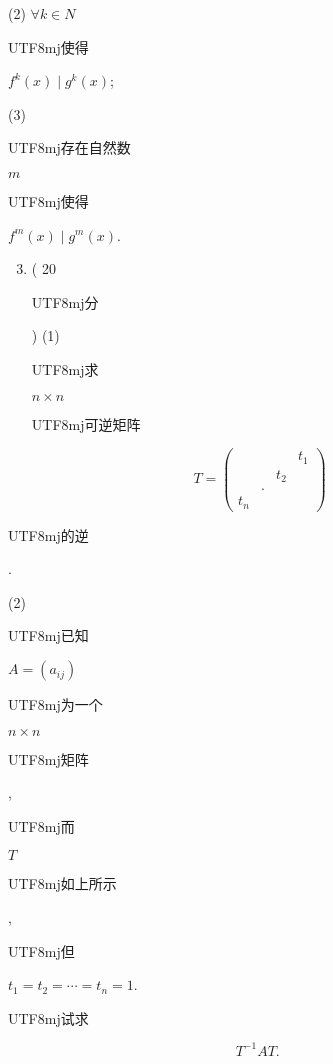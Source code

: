 \documentclass[10pt]{article}
\begin{document}
(2) $\forall k \in N$ \begin{CJK}{UTF8}{mj}使得\end{CJK} $f^{k}(x) \mid g^{k}(x)$;

(3) \begin{CJK}{UTF8}{mj}存在自然数\end{CJK} $m$ \begin{CJK}{UTF8}{mj}使得\end{CJK} $f^{m}(x) \mid g^{m}(x)$.

\begin{enumerate}
  \setcounter{enumi}{2}
  \item ( 20 \begin{CJK}{UTF8}{mj}分\end{CJK}) (1) \begin{CJK}{UTF8}{mj}求\end{CJK} $n \times n$ \begin{CJK}{UTF8}{mj}可逆矩阵\end{CJK}
\end{enumerate}
$$
T=\left(\begin{array}{cccc} 
& & & t_{1} \\
& & t_{2} & \\
& . & & \\
t_{n} & & &
\end{array}\right)
$$
\begin{CJK}{UTF8}{mj}的逆\end{CJK}.

(2) \begin{CJK}{UTF8}{mj}已知\end{CJK} $A=\left(a_{i j}\right)$ \begin{CJK}{UTF8}{mj}为一个\end{CJK} $n \times n$ \begin{CJK}{UTF8}{mj}矩阵\end{CJK}, \begin{CJK}{UTF8}{mj}而\end{CJK} $T$ \begin{CJK}{UTF8}{mj}如上所示\end{CJK}, \begin{CJK}{UTF8}{mj}但\end{CJK} $t_{1}=t_{2}=\cdots=t_{n}=1$. \begin{CJK}{UTF8}{mj}试求\end{CJK}
$$
T^{-1} A T \text {. }
$$
\end{document}

